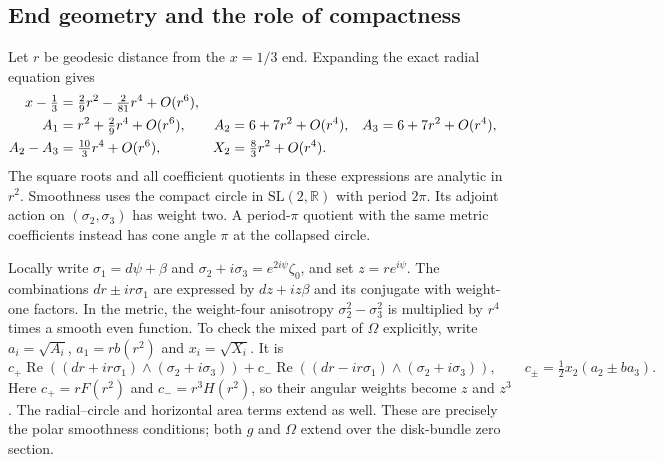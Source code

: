 \documentclass[11pt]{article}
\newcommand{\R}{\mathbb R}
\theoremstyle{definition}
\theoremstyle{remark}
\begin{document}
\subsection{End geometry and the role of compactness}
\label{sec:ends}

Let $r$ be geodesic distance from the $x=1/3$ end. Expanding the exact
radial equation gives
\begin{align}
 x-\tfrac13&=\tfrac29r^2-\tfrac2{81}r^4+O(r^6),\notag\\
 A_1&=r^2+\tfrac29r^4+O(r^6),&
 A_2&=6+7r^2+O(r^4),& A_3&=6+7r^2+O(r^4),\notag\\
 A_2-A_3&=\tfrac{10}{3}r^4+O(r^6),&
 X_2&=\tfrac83r^2+O(r^4).\label{eq:bolt-series}
\end{align}
The square roots and all coefficient quotients in these expressions are
analytic in $r^2$. Smoothness uses the compact circle in
$\mathrm{SL}(2,\R)$ with period $2\pi$. Its adjoint action on
$(\sigma_2,\sigma_3)$ has weight two. A period-$\pi$ quotient with the
same metric coefficients instead has cone angle $\pi$ at the collapsed
circle.

Locally write
$\sigma_1=d\psi+\beta$ and
$\sigma_2+i\sigma_3=e^{2i\psi}\zeta_0$, and set $z=re^{i\psi}$.
The combinations $dr\pm ir\sigma_1$ are expressed by
$dz+iz\beta$ and its conjugate with weight-one factors. In the metric,
the weight-four anisotropy $\sigma_2^2-\sigma_3^2$ is multiplied by
$r^4$ times a smooth even function. To check the mixed part of $\Omega$
explicitly, write $a_i=\sqrt{A_i}$, $a_1=r b(r^2)$ and $x_i=\sqrt{X_i}$.
It is
\[
 c_+\operatorname{Re}((dr+ir\sigma_1)\wedge(\sigma_2+i\sigma_3))
 +c_-\operatorname{Re}((dr-ir\sigma_1)\wedge(\sigma_2+i\sigma_3)),
 \qquad c_\pm=\tfrac12x_2(a_2\pm b a_3).
\]
Here $c_+=rF(r^2)$ and $c_-=r^3H(r^2)$, so their angular weights
become $z$ and $z^3$.
The radial--circle and horizontal area terms extend as well. These are
precisely the polar smoothness conditions; both $g$ and $\Omega$ extend
over the disk-bundle zero section.
\end{document}
